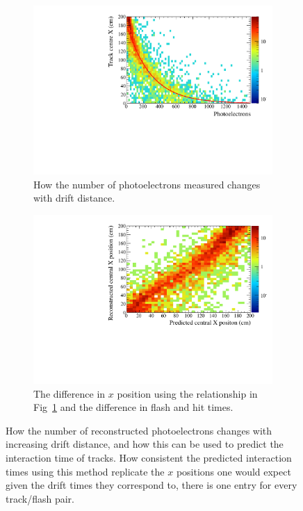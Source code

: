 \begin{figure}[h!]
  \centering
  \begin{subfigure}{0.45\textwidth}
    \centering
    \includegraphics[width=\textwidth]{NumPE_Distance}
    \caption{How the number of photoelectrons measured changes with drift distance.}
    \label{fig:PD_PExPlot}
  \end{subfigure}
  \hspace{0.08\textwidth}
  \begin{subfigure}{0.45\textwidth}
    \centering
    \includegraphics[width=\textwidth]{DiffFlashPredReco}
    \caption{The difference in $x$ position using the relationship in Fig~\ref{fig:PD_PExPlot} and the difference in flash and hit times.}
    \label{fig:PD_PEDiffX}
  \end{subfigure}
  \caption[Matching tracks and flashes in the 35 ton using photoelectron information]
          {How the number of reconstructed photoelectrons changes with increasing drift distance, and how this can be used to predict the interaction time of tracks. How consistent the predicted interaction times using this method replicate the $x$ positions one would expect given the drift times they correspond to, there is one entry for every track/flash pair.}
\end{figure}

